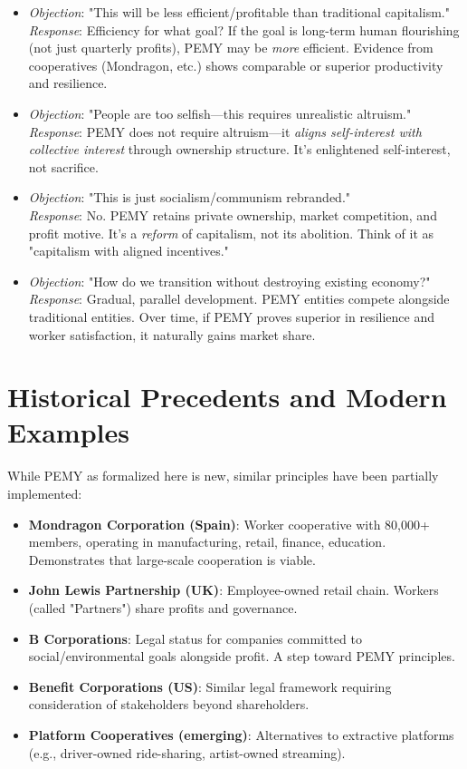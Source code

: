 \documentclass[11pt,a4paper]{article}
\theoremstyle{definition}
\theoremstyle{remark}
\begin{document}
\begin{itemize}
\item \textit{Objection}: "This will be less efficient/profitable than traditional capitalism." \\
\textit{Response}: Efficiency for what goal? If the goal is long-term human flourishing (not just quarterly profits), PEMY may be \textit{more} efficient. Evidence from cooperatives (Mondragon, etc.) shows comparable or superior productivity and resilience.

\item \textit{Objection}: "People are too selfish—this requires unrealistic altruism." \\
\textit{Response}: PEMY does not require altruism—it \textit{aligns self-interest with collective interest} through ownership structure. It's enlightened self-interest, not sacrifice.

\item \textit{Objection}: "This is just socialism/communism rebranded." \\
\textit{Response}: No. PEMY retains private ownership, market competition, and profit motive. It's a \textit{reform} of capitalism, not its abolition. Think of it as "capitalism with aligned incentives."

\item \textit{Objection}: "How do we transition without destroying existing economy?" \\
\textit{Response}: Gradual, parallel development. PEMY entities compete alongside traditional entities. Over time, if PEMY proves superior in resilience and worker satisfaction, it naturally gains market share.
\end{itemize}

\section{Historical Precedents and Modern Examples}

While PEMY as formalized here is new, similar principles have been partially implemented:

\begin{itemize}
\item \textbf{Mondragon Corporation (Spain)}: Worker cooperative with 80,000+ members, operating in manufacturing, retail, finance, education. Demonstrates that large-scale cooperation is viable.
\item \textbf{John Lewis Partnership (UK)}: Employee-owned retail chain. Workers (called "Partners") share profits and governance.
\item \textbf{B Corporations}: Legal status for companies committed to social/environmental goals alongside profit. A step toward PEMY principles.
\item \textbf{Benefit Corporations (US)}: Similar legal framework requiring consideration of stakeholders beyond shareholders.
\item \textbf{Platform Cooperatives (emerging)}: Alternatives to extractive platforms (e.g., driver-owned ride-sharing, artist-owned streaming).
\end{itemize}
\end{document}
